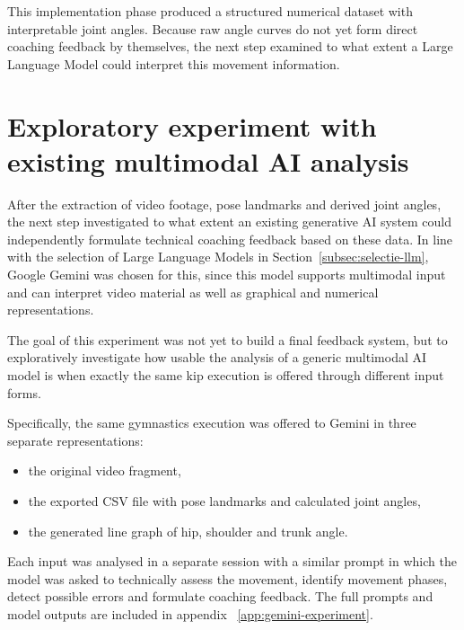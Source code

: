 This implementation phase produced a structured numerical dataset with interpretable joint angles. Because raw angle curves do not yet form direct coaching feedback by themselves, the next step examined to what extent a Large Language Model could interpret this movement information.

\section{Exploratory experiment with existing multimodal AI analysis}

After the extraction of video footage, pose landmarks and derived joint angles, the next step investigated to what extent an existing generative AI system could independently formulate technical coaching feedback based on these data. In line with the selection of Large Language Models in Section~\ref{subsec:selectie-llm}, Google Gemini was chosen for this, since this model supports multimodal input and can interpret video material as well as graphical and numerical representations.

The goal of this experiment was not yet to build a final feedback system, but to exploratively investigate how usable the analysis of a generic multimodal AI model is when exactly the same kip execution is offered through different input forms.

Specifically, the same gymnastics execution was offered to Gemini in three separate representations:

\begin{itemize}
    \item the original video fragment,
    \item the exported CSV file with pose landmarks and calculated joint angles,
    \item the generated line graph of hip, shoulder and trunk angle.
\end{itemize}

Each input was analysed in a separate session with a similar prompt in which the model was asked to technically assess the movement, identify movement phases, detect possible errors and formulate coaching feedback. The full prompts and model outputs are included in appendix ~\ref{app:gemini-experiment}.

